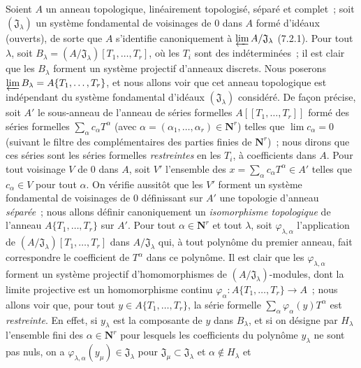\begin{env}[7.5.1]
\label{0.7.5.1-fr}
Soient $A$ un anneau topologique, linéairement topologisé, séparé et complet~;
soit $(\mathfrak J_\lambda)$ un système fondamental de voisinages de $0$ dans
$A$ formé d'idéaux (ouverts), de sorte que $A$ s'identifie canoniquement à
$\varprojlim A/\mathfrak J_\lambda$ (7.2.1). Pour tout $\lambda$, soit
$B_\lambda=(A/\mathfrak J_\lambda)[T_1,\ldots,T_r]$, où les $T_i$ sont des
indéterminées~; il est clair que les $B_\lambda$ forment un système projectif
d'anneaux discrets. Nous poserons
$\varprojlim B_\lambda=A\{T_1,\ldots,T_r\}$, et nous allons voir que cet anneau
topologique est indépendant du système fondamental d'idéaux
$(\mathfrak J_\lambda)$ considéré. De façon précise, soit $A'$ le sous-anneau
de l'anneau de séries formelles $A[\![T_1,\ldots,T_r]\!]$ formé des séries
formelles $\sum_\alpha c_\alpha T^\alpha$ (avec
$\alpha=(\alpha_1,\ldots,\alpha_r)\in\mathbf{N}^r$) telles que
$\lim c_\alpha=0$ (suivant le filtre des complémentaires des parties
finies de $\mathbf{N}^r$)~; nous dirons que ces séries sont les séries
formelles \emph{restreintes} en les $T_i$, à coefficients dans $A$.
Pour tout voisinage $V$ de $0$ dans $A$, soit $V'$ l'ensemble des
$x=\sum_\alpha c_\alpha T^\alpha\in A'$ telles que $c_\alpha\in V$ pour tout
$\alpha$. On vérifie aussitôt que les $V'$ forment un système fondamental de
voisinages de $0$ définissant sur $A'$ une topologie d'anneau \emph{séparée}~;
nous allons définir canoniquement un \emph{isomorphisme topologique} de
l'anneau $A\{T_1,\ldots,T_r\}$ sur $A'$. Pour tout
$\alpha\in\mathbf{N}^r$ et tout $\lambda$, soit
$\varphi_{\lambda,\alpha}$ l'application de
$(A/\mathfrak J_\lambda)[T_1,\ldots,T_r]$ dans
$A/\mathfrak J_\lambda$ qui, à tout polynôme du premier anneau, fait
correspondre le coefficient de $T^\alpha$ dans ce polynôme. Il est clair que
les $\varphi_{\lambda,\alpha}$ forment un système projectif d'homomorphismes
de $(A/\mathfrak J_\lambda)$-modules, dont la limite projective est un
homomorphisme continu
$\varphi_\alpha:A\{T_1,\ldots,T_r\}\to A$~; nous allons voir que, pour tout
$y\in A\{T_1,\ldots,T_r\}$, la série formelle
$\sum_\alpha\varphi_\alpha(y)T^\alpha$ est \emph{restreinte}. En effet, si
$y_\lambda$ est la composante de $y$ dans $B_\lambda$, et si on désigne par
$H_\lambda$ l'ensemble fini des $\alpha\in\mathbf{N}^r$ pour lesquels les
coefficients du polynôme $y_\lambda$ ne sont pas nuls, on a
$\varphi_{\lambda,\alpha}(y_\mu)\in\mathfrak J_\lambda$ pour
$\mathfrak J_\mu\subset\mathfrak J_\lambda$ et $\alpha\notin H_\lambda$ et

\end{env}
